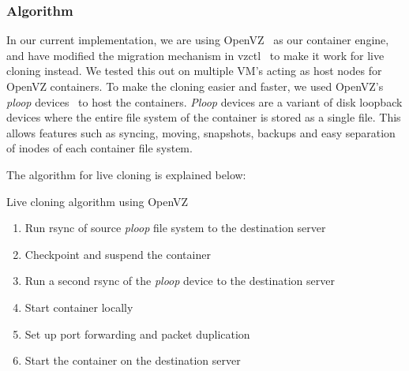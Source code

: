 

\subsubsection{Algorithm}


In our current implementation, we are using OpenVZ~\cite{openvz} as our container engine, and have modified the migration mechanism in vzctl~\cite{vzctl} to make it work for live cloning instead. 
We tested this out on multiple VM's acting as host nodes for OpenVZ containers. 
To make the cloning easier and faster, we used OpenVZ's \textit{ploop} devices~\cite{ploop} to host the containers. 
\textit{Ploop} devices are a variant of disk loopback devices where the entire file system of the container is stored as a single file. 
This allows features such as syncing, moving, snapshots, backups and easy separation of inodes of each container file system.

The algorithm for live cloning is explained below: 
\begin{algorithm}[ht!]
  \caption{Live cloning algorithm using OpenVZ} 
  \label{algCloning}
  \begin{enumerate}[topsep=0pt,itemsep=-1ex,partopsep=1ex,parsep=1ex]
  \item Run rsync of source \textit{ploop} file system to the destination server  
  \item Checkpoint and suspend the container 
  \item Run a second rsync of the \textit{ploop} device to the destination  server
  \item Start container locally 
  \item Set up port forwarding and packet duplication
  \item Start the container on the destination server
  \end{enumerate}
\end{algorithm}

